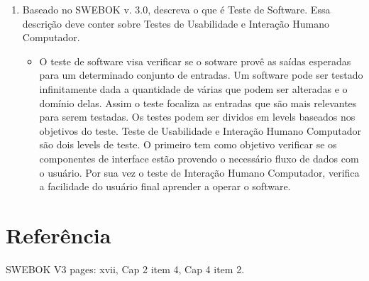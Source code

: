 \documentclass{article}
\begin{document}
\begin{enumerate}
\begin{itemize}
	\end{itemize}
\item Baseado   no   SWEBOK   v.   3.0,   descreva   o   que   é   Teste   de   Software.   Essa   descrição  
deve conter sobre Testes de Usabilidade e Interação Humano Computador. 
	\begin{itemize}
	\item[] O teste de software visa verificar se o sotware provê as saídas esperadas para um determinado conjunto de entradas. Um software pode ser testado infinitamente dada a quantidade de várias que podem ser alteradas e o domínio delas. Assim o teste focaliza as entradas que são mais relevantes para serem testadas. Os testes podem ser dividos em levels baseados nos objetivos do teste. Teste de Usabilidade e Interação Humano Computador são dois levels de teste. O primeiro tem como objetivo verificar se os componentes de interface estão provendo o necessário fluxo de dados com o usuário. Por sua vez o teste de Interação Humano Computador, verifica a facilidade do usuário final aprender a operar o software.
	\end{itemize}
\end{enumerate}

\newpage
\section{Referência}
SWEBOK V3 pages: xvii, Cap 2 item 4, Cap 4 item 2.
\end{document}
